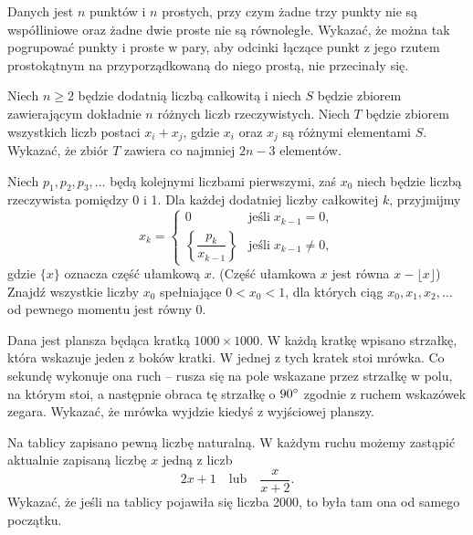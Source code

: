 \begin{problem}{1}
	Danych jest $n$ punktów i $n$ prostych, przy czym żadne trzy punkty nie są współliniowe oraz żadne dwie proste nie są równoległe. Wykazać, że można tak pogrupować punkty i proste w pary, aby odcinki łączące punkt z jego rzutem prostokątnym na przyporządkowaną do niego prostą, nie przecinały się.
\end{problem}

\begin{problem}{2}
	Niech $n \geqslant 2$ będzie dodatnią liczbą całkowitą i niech $S$ będzie zbiorem zawierającym dokładnie $n$ różnych liczb rzeczywistych. Niech $T$ będzie zbiorem wszystkich liczb postaci $x_i + x_j$, gdzie $x_i$ oraz $x_j$ są różnymi elementami $S$. Wykazać, że zbiór $T$ zawiera co najmniej $2n - 3$ elementów.
\end{problem}

\begin{problem}{3}
	Niech $p_1, p_2, p_3, \ldots$ będą kolejnymi liczbami pierwszymi, zaś $x_0$ niech będzie liczbą rzeczywista pomiędzy 0 i 1. Dla każdej dodatniej liczby całkowitej $k$, przyjmijmy
\[
	x_k = \begin{cases} 
	0 & \text{jeśli} \; x_{k-1} = 0, \\
	\left\{ \dfrac{p_k}{x_{k-1}} \right\} & \text{jeśli} \; x_{k-1} \neq 0, 
	\end{cases}  
\]
gdzie $\{x\}$ oznacza część ułamkową $x$. (Część ułamkowa $x$ jest równa $x - \lfloor x \rfloor$) Znajdź wszystkie liczby $x_0$ spełniające $0 < x_0 < 1$, dla których ciąg $x_0, x_1, x_2, \ldots$ od pewnego momentu jest równy 0.
\end{problem}

\begin{problem}{4}
	Dana jest plansza będąca kratką $1000\times 1000$. W każdą kratkę wpisano strzałkę, która wskazuje jeden z boków kratki. W jednej z tych kratek stoi mrówka. Co sekundę wykonuje ona ruch -- rusza się na pole wskazane przez strzałkę w polu, na którym stoi, a następnie obraca tę strzałkę o $90\degree$ zgodnie z ruchem wskazówek zegara. Wykazać, że mrówka wyjdzie kiedyś z wyjściowej planszy.
\end{problem}

\begin{problem}{5}
Na tablicy zapisano pewną liczbę naturalną. W każdym ruchu możemy zastąpić aktualnie zapisaną liczbę $x$ jedną z liczb 
\[
    2x + 1 \quad  \text{lub} \quad \dfrac{x}{x + 2}.
\]
Wykazać, że jeśli na tablicy pojawiła się liczba 2000, to była tam ona od samego początku.
\end{problem}



